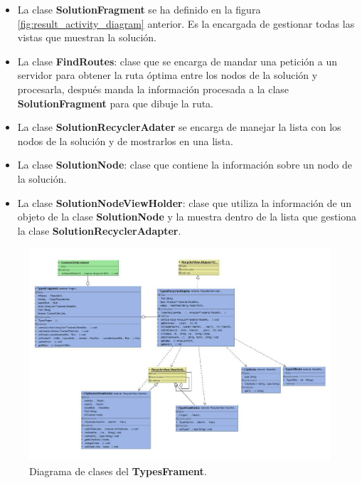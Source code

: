 \begin{itemize}
	\item La clase \textbf{SolutionFragment} se ha definido en la figura \ref{fig:result_activity_diagram} anterior. Es la encargada de gestionar todas las vistas que muestran la solución.
	\item La clase \textbf{FindRoutes}: clase que se encarga de mandar una petición a un servidor para obtener la ruta óptima entre los nodos de la solución y procesarla, después manda la información procesada a la clase \textbf{SolutionFragment} para que dibuje la ruta.
	\item La clase \textbf{SolutionRecyclerAdater} se encarga de manejar la lista con los nodos de la solución y de mostrarlos en una lista.
	\item La clase \textbf{SolutionNode}: clase que contiene la información sobre un nodo de la solución.
	\item La clase \textbf{SolutionNodeViewHolder}: clase que utiliza la información de un objeto de la clase \textbf{SolutionNode}  y la muestra dentro de la lista que gestiona la clase \textbf{SolutionRecyclerAdapter}.
\end{itemize}
\newpage
\begin{figure}[H]
	\centering
	\includegraphics[scale=.8,angle=90]{imagenes/fragment_class_diagram.pdf}
	\caption{Diagrama de clases del \textbf{TypesFrament}.}
	\label{fig:fragment_diagram}
\end{figure}
